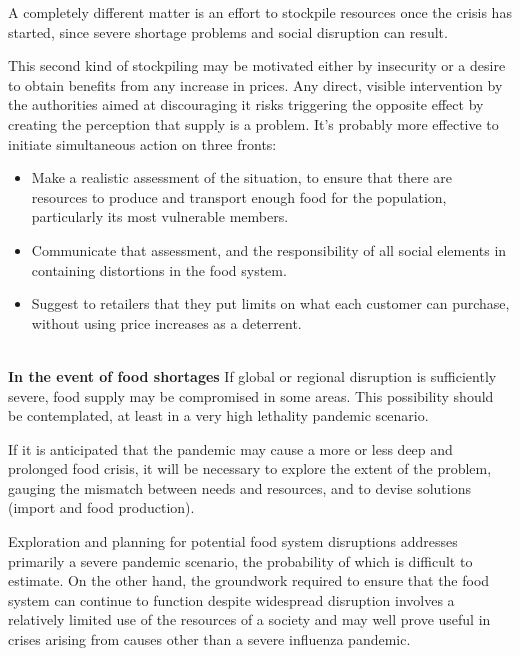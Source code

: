 \documentclass[12pt, a4]{scrartcl}
\begin{document}
A completely different matter is an effort to stockpile resources once the crisis has started, since severe shortage problems and social disruption can result.

This second kind of stockpiling may be motivated either by insecurity or a desire to obtain benefits from any increase in prices. Any direct, visible intervention by the authorities aimed at discouraging it risks triggering the opposite effect by creating the perception that supply is a problem. It's probably more effective to initiate simultaneous action on three fronts:

\begin{itemize}
	\item Make a realistic assessment of the situation, to ensure that there are resources to produce and transport enough food for the population, particularly its most vulnerable members.
	\item Communicate that assessment, and the responsibility of all social elements in containing distortions in the food system.
	\item Suggest to retailers that they put limits on what each customer can purchase, without using price increases as a deterrent.
\end{itemize}
\\
\textbf{In the event of food shortages}
If global or regional disruption is sufficiently severe, food supply may be compromised in some areas. This possibility should be contemplated, at least in a very high lethality pandemic scenario.

If it is anticipated that the pandemic may cause a more or less deep and prolonged food crisis, it will be necessary to explore the extent of the problem, gauging the mismatch between needs and resources, and to devise solutions (import and food production).

Exploration and planning for potential food system disruptions addresses primarily a severe pandemic scenario, the probability of which is difficult to estimate. On the other hand, the groundwork required to ensure that the food system can continue to function despite widespread disruption involves a relatively limited use of the resources of a society and may well prove useful in crises arising from causes other than a severe influenza pandemic.
\end{document}
